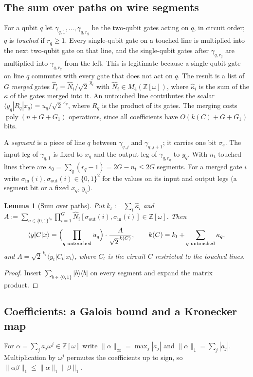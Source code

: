 \documentclass[10pt]{amsart}
\theoremstyle{plain}
\newtheorem{lemma}[theorem]{Lemma}
\theoremstyle{definition}
\theoremstyle{remark}
\numberwithin{equation}{section}
\newcommand{\Z}{\mathbb{Z}}
\newcommand{\Zw}{\Z[\omega]}
\newcommand{\poly}{\operatorname{poly}}
\newcommand{\ket}[1]{|#1\rangle}
\newcommand{\bra}[1]{\langle#1|}
\newcommand{\amp}[3]{\langle #1|#2|#3\rangle}
\begin{document}
\subsection{The sum over paths on wire segments}\label{sec:paths}
For a qubit $q$ let $\gamma_{q,1},\dots,\gamma_{q,r_q}$ be the two-qubit gates acting on $q$, in
circuit order; $q$ is \emph{touched} if $r_q\ge1$. Every single-qubit gate on a touched line is
multiplied into the next two-qubit gate on that line, and the single-qubit gates after
$\gamma_{q,r_q}$ are multiplied into $\gamma_{q,r_q}$ from the left. This is legitimate because a
single-qubit gate on line $q$ commutes with every gate that does not act on $q$. The result is a
list of $G$ \emph{merged} gates $\hat\Gamma_i=\hat N_i/\sqrt2^{\,\hat\kappa_i}$ with
$\hat N_i\in M_4(\Zw)$, where $\hat\kappa_i$ is the sum of the $\kappa$ of the gates merged into
it. An untouched line contributes the scalar $\amp{y_q}{R_q}{x_q}=u_q/\sqrt2^{\,\kappa_q}$, where
$R_q$ is the product of its gates. The merging costs $\poly(n+G+G_1)$ operations, since all
coefficients have $O(k(C)+G+G_1)$ bits.

A \emph{segment} is a piece of line $q$ between $\gamma_{q,j}$ and $\gamma_{q,j+1}$; it carries
one bit $\sigma_e$. The input leg of $\gamma_{q,1}$ is fixed to $x_q$ and the output leg of
$\gamma_{q,r_q}$ to $y_q$. With $n_t$ touched lines there are $s_0=\sum_q(r_q-1)=2G-n_t\le2G$
segments. For a merged gate $i$ write $\sigma_{\mathrm{in}}(i),\sigma_{\mathrm{out}}(i)\in\{0,1\}^2$
for the values on its input and output legs (a segment bit or a fixed $x_q$, $y_q$).

\begin{lemma}[Sum over paths]\label{lem:paths}
Put $k_t:=\sum_i\hat\kappa_i$ and $A:=\sum_{\sigma\in\{0,1\}^{s_0}}\prod_{i=1}^G\hat N_i[\sigma_{\mathrm{out}}(i),\sigma_{\mathrm{in}}(i)]\in\Zw$. Then
\[
 \amp{y}{C}{x}=\Bigl(\prod_{q\text{ untouched}}u_q\Bigr)\cdot\frac{A}{\sqrt2^{\,k(C)}},\qquad
 k(C)=k_t+\sum_{q\text{ untouched}}\kappa_q,
\]
and $A=\sqrt2^{\,k_t}\amp{y_t}{C_t}{x_t}$, where $C_t$ is the circuit $C$ restricted to the
touched lines.
\end{lemma}

\begin{proof}
Insert $\sum_{b\in\{0,1\}}\ket b\bra b$ on every segment and expand the matrix product.
\end{proof}

\subsection{Coefficients: a Galois bound and a Kronecker map}
For $\alpha=\sum_ja_j\omega^j\in\Zw$ write $\|\alpha\|_\infty=\max_j|a_j|$ and
$\|\alpha\|_1=\sum_j|a_j|$. Multiplication by $\omega^j$ permutes the coefficients up to sign, so
$\|\alpha\beta\|_1\le\|\alpha\|_1\|\beta\|_1$.
\end{document}
